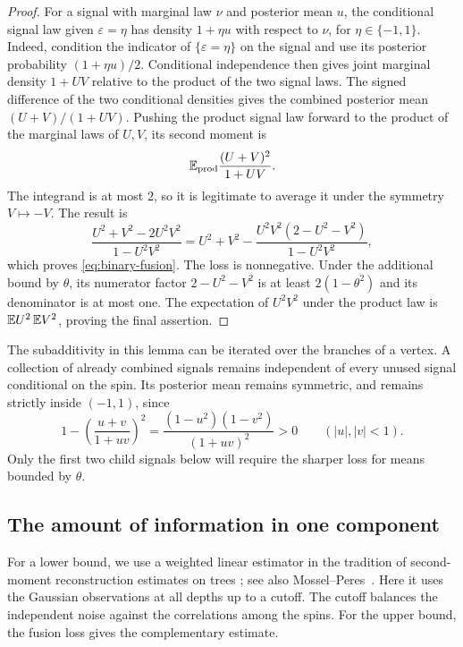 \begin{proof}
For a signal with marginal law \(\nu\) and posterior mean \(u\), the
conditional signal law given \(\varepsilon=\eta\) has density
\(1+\eta u\) with respect to \(\nu\), for \(\eta\in\{-1,1\}\).
Indeed, condition the indicator of \(\{\varepsilon=\eta\}\) on the
signal and use its posterior probability \((1+\eta u)/2\).
Conditional independence then gives joint marginal density \(1+UV\)
relative to the product of the two signal laws.  The signed difference
of the two conditional densities gives the combined posterior mean
\((U+V)/(1+UV)\).  Pushing the product signal law forward to the
product of the marginal laws of \(U,V\), its second moment is
\[
 \mathbb E_{\mathrm{prod}}\frac{(U+V)^2}{1+UV}.
\]
The integrand is at most \(2\), so it is legitimate to average it
under the symmetry \(V\mapsto -V\).  The result is
\[
 \frac{U^2+V^2-2U^2V^2}{1-U^2V^2}
   =U^2+V^2-
       \frac{U^2V^2(2-U^2-V^2)}{1-U^2V^2},
\]
which proves \eqref{eq:binary-fusion}.  The loss is nonnegative.
Under the additional bound by \(\theta\), its numerator factor
\(2-U^2-V^2\) is at least \(2(1-\theta^2)\) and its denominator is
at most one.  The expectation of \(U^2V^2\) under the product law is
\(\mathbb E U^2\,\mathbb E V^2\), proving the final assertion.
\end{proof}

The subadditivity in this lemma can be iterated over the branches of a
vertex.  A collection of already combined signals remains independent
of every unused signal conditional on the spin.  Its posterior mean
remains symmetric, and remains strictly inside \((-1,1)\), since
\[
 1-\left(\frac{u+v}{1+uv}\right)^2
   =\frac{(1-u^2)(1-v^2)}{(1+uv)^2}>0
 \qquad (|u|,|v|<1).
\]
Only the first two child signals below will require the sharper
loss for means bounded by \(\theta\).

\subsection{The amount of information in one component}

For a lower bound, we use a weighted linear estimator in the tradition
of second-moment reconstruction estimates on trees
\cite{EvansKenyonPeresSchulman2000}; see also
Mossel--Peres~\cite[Section~5, Lemma~5.3]{MosselPeres2003}. Here it uses the
Gaussian observations at all depths up to a cutoff.  The cutoff balances
the independent noise against the correlations among the spins.
For the upper bound, the fusion loss gives the complementary estimate.

